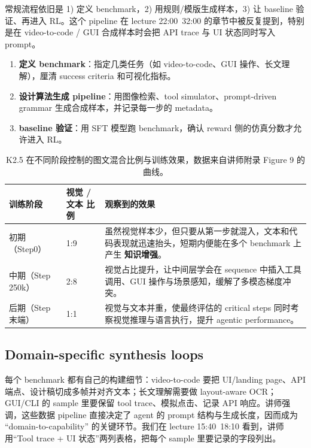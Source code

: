 \documentclass[a4paper]{article}
\begin{document}
常规流程依旧是 1) 定义 benchmark，2) 用规则/模版生成样本，3) 让 baseline 验证、再进入 RL。这个 pipeline 在 lecture 22:00~32:00 的章节中被反复提到，特别是在 video-to-code / GUI 合成样本时会把 API trace 与 UI 状态同时写入 prompt。

\begin{enumerate}
    \item \textbf{定义 benchmark}：指定几类任务（如 video-to-code、GUI 操作、长文理解），厘清 success criteria 和可视化指标。
    \item \textbf{设计算法生成 pipeline}：用图像检索、tool simulator、prompt-driven grammar 生成合成样本，并记录每一步的 metadata。
    \item \textbf{baseline 验证}：用 SFT 模型跑 benchmark，确认 reward 侧的仿真分数才允许进入 RL。
\end{enumerate}

\begin{table}[H]
\footnotesize
\centering
\begin{tabular}{p{3cm}p{4cm}p{7cm}}
\toprule
训练阶段 & 视觉 / 文本 比例 & 观察到的效果 \\
\midrule
初期（Step0） & 1:9 & 虽然视觉样本少，但只要从第一步就混入，文本和代码表现就迅速抬头，短期内便能在多个 benchmark 上产生 \textbf{知识增强}。 \\
中期（Step 250k） & 2:8 & 视觉占比提升，让中间层学会在 sequence 中插入工具调用、GUI 操作与场景感知，缓解了多模态梯度冲突。 \\
后期（Step 末端） & 1:1 & 视觉与文本并重，使最终评估的 critical steps 同时考察视觉推理与语言执行，提升 agentic performance。 \\
\bottomrule
\end{tabular}
\caption{K2.5 在不同阶段控制的图文混合比例与训练效果，数据来自讲师附录 Figure 9 的曲线。}
\end{table}

\subsection{Domain-specific synthesis loops}
每个 benchmark 都有自己的构建细节：video-to-code 要把 UI/landing page、API 端点、设计稿切成多帧并对齐文本；长文理解需要做 layout-aware OCR；GUI/CLI 的 sample 里要保留 tool trace、模拟点击、记录 API 响应。讲师强调，这些数据 pipeline 直接决定了 agent 的 prompt 结构与生成长度，因而成为 ``domain-to-capability'' 的关键环节。我们在 lecture 15:40~18:10 看到，讲师用``Tool trace + UI 状态''两列表格，把每个 sample 里要记录的字段列出。
\end{document}
